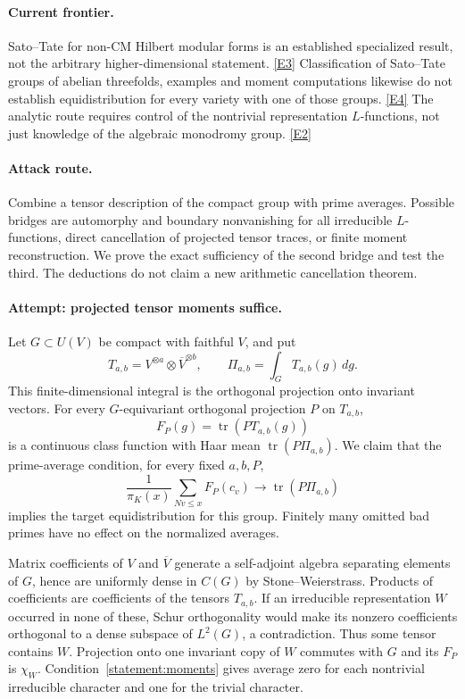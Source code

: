 \documentclass[11pt,a4paper]{article}
\newcommand{\eref}[2]{\hyperlink{extra:#1:#2}{[E#2]}}
\numberwithin{equation}{section}
\begin{document}
\paragraph{Current frontier.}
Sato--Tate for non-CM Hilbert modular forms is an established specialized
result, not the arbitrary higher-dimensional statement. \eref{statement}{3}
Classification of Sato--Tate groups of abelian threefolds, examples and
moment computations likewise do not establish equidistribution for every
variety with one of those groups. \eref{statement}{4} The analytic route requires
control of the nontrivial representation $L$-functions, not just knowledge
of the algebraic monodromy group. \eref{statement}{2}

\paragraph{Attack route.}
Combine a tensor description of the compact group with prime averages.
Possible bridges are automorphy and boundary nonvanishing for all irreducible
$L$-functions, direct cancellation of projected tensor traces, or finite
moment reconstruction. We prove the exact sufficiency of the second bridge
and test the third. The deductions do not claim a new arithmetic
cancellation theorem.

\paragraph{Attempt: projected tensor moments suffice.}
Let $G\subset U(V)$ be compact with faithful $V$, and put
\[
 T_{a,b}=V^{\otimes a}\otimes\overline V^{\otimes b},\qquad
 \Pi_{a,b}=\int_G T_{a,b}(g)\,dg.
\]
This finite-dimensional integral is the orthogonal projection onto invariant
vectors. For every $G$-equivariant orthogonal projection $P$ on $T_{a,b}$,
\[
 F_P(g)=\operatorname{tr}(P T_{a,b}(g))
\]
is a continuous class function with Haar mean $\operatorname{tr}(P\Pi_{a,b})$.
We claim that the prime-average condition, for every fixed $a,b,P$,
\begin{equation}\label{statement:moments}
 \frac1{\pi_K(x)}\sum_{Nv\le x}F_P(c_v)
       \longrightarrow\operatorname{tr}(P\Pi_{a,b})
\end{equation}
implies the target equidistribution for this group. Finitely many omitted
bad primes have no effect on the normalized averages.

Matrix coefficients of $V$ and $\overline V$ generate a self-adjoint algebra
separating elements of $G$, hence are uniformly dense in $C(G)$ by
Stone--Weierstrass. Products of coefficients are coefficients of the tensors
$T_{a,b}$. If an irreducible representation $W$ occurred in none of these,
Schur orthogonality would make its nonzero coefficients orthogonal to a
dense subspace of $L^2(G)$, a contradiction. Thus some tensor contains $W$.
Projection onto one invariant copy of $W$ commutes with $G$ and its $F_P$
is $\chi_W$. Condition~\eqref{statement:moments} gives average zero for each
nontrivial irreducible character and one for the trivial character.
\end{document}
